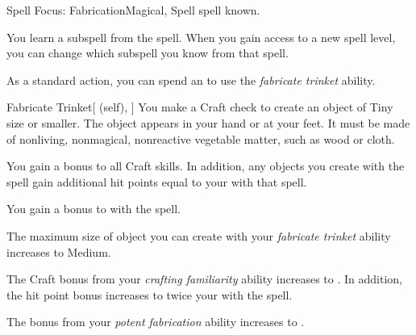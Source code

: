     \begin{feat}{Spell Focus: Fabrication}{Magical, Spell}
        \featpre {} spell known.

         You learn a subspell from the  spell.
        When you gain access to a new spell level, you can change which subspell you know from that spell.

         As a standard action, you can spend an  to use the \textit{fabricate trinket} ability.
        \begin{ability}{Fabricate Trinket}[ (self), ]
            You make a Craft check to create an object of Tiny size or smaller.
            The object appears in your hand or at your feet.
            It must be made of nonliving, nonmagical, nonreactive vegetable matter, such as wood or cloth.
        \end{ability}

         You gain a  bonus to all Craft skills.
        In addition, any objects you create with the  spell gain additional hit points equal to your  with that spell.

         You gain a  bonus to  with the  spell.

         The maximum size of object you can create with your \textit{fabricate trinket} ability increases to Medium.

         The Craft bonus from your \textit{crafting familiarity} ability increases to .
        In addition, the hit point bonus increases to twice your  with the  spell.

         The bonus from your \textit{potent fabrication} ability increases to .
    \end{feat}

